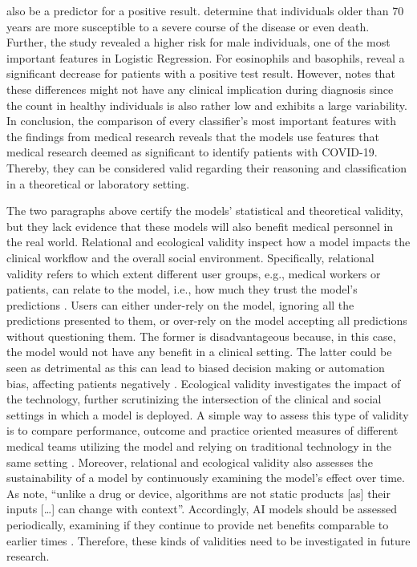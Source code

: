 also be a predictor for a positive result. \citeauthor{RN193} \cite{RN193} 
determine that individuals 
older than 70 years are more susceptible to a severe course of the disease or 
even death. Further, the study revealed a higher risk for male individuals, 
one of the most important features in Logistic Regression.
For eosinophils and basophils, \cite{RN162, RN185} reveal a significant 
decrease for patients with a positive test result. However, \cite{RN162} notes 
that these differences might not have any clinical implication during diagnosis 
since the count in healthy individuals is also rather low and exhibits a large 
variability.
In conclusion, the comparison of every classifier's most important features 
with the findings from medical research reveals that the models use 
features that medical research deemed as significant to identify patients with 
COVID-19. Thereby, they can be considered valid regarding their reasoning and 
classification in a theoretical or laboratory setting.
\par
The two paragraphs above certify the models' statistical and theoretical 
validity, but they lack evidence that these models will also benefit medical 
personnel in the real world. Relational and ecological validity inspect how a 
model impacts the clinical workflow and the overall social environment. 
Specifically, relational validity refers to which extent different user groups, 
e.g., medical workers or patients, can relate to the model, i.e., how much they 
trust the model's predictions \cite{RN151}. Users can either under-rely on 
the model, ignoring all the predictions presented to them, or over-rely on the 
model accepting all predictions without questioning them. The former is 
disadvantageous because, in this case, the model would not have any benefit in 
a clinical setting. The latter could be seen as detrimental as this can lead to 
biased decision making or automation bias, affecting patients 
negatively \cite{RN151, RN152}.
Ecological validity investigates the impact of the technology, further 
scrutinizing the intersection of the clinical and social settings in which a 
model is deployed. A simple way to assess this type of validity is to compare 
performance, outcome and practice oriented measures of different medical 
teams utilizing the model and relying on traditional technology in the same 
setting \cite{RN152}. Moreover, relational and ecological validity also 
assesses the sustainability of a model by continuously examining the model's 
effect over time. As \citeauthor{RN198} \cite{RN198} note, ``unlike a drug or 
device, algorithms are not static products [as] their inputs […] can change 
with context''. Accordingly, AI models should be assessed periodically, 
examining if they continue to provide net benefits comparable to earlier times 
\cite{RN152}. Therefore, these kinds of validities need to be investigated in 
future research.
